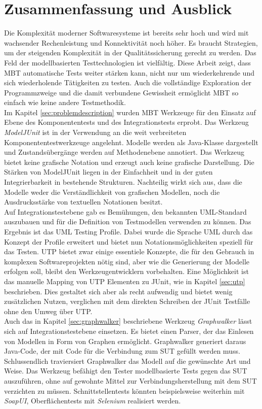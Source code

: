 \section{Zusammenfassung und Ausblick}
\label{sec:conclusion}
Die Komplexität moderner Softwaresysteme ist bereits sehr hoch und wird mit wachsender Rechenleistung und Konnektivität noch höher. Es braucht Strategien, um der steigenden Komplexität in der Qualitätssicherung gerecht zu werden. Das Feld der modellbasierten Testtechnologien ist vielfältig. Diese Arbeit zeigt, dass \Gls{MBT} automatische Tests weiter stärken kann, nicht nur um wiederkehrende und sich wiederholende Tätigkeiten zu testen. Auch die vollständige Exploration der Programmzweige und die damit verbundene Gewissheit ermöglicht \Gls{MBT} so einfach wie keine andere Testmethodik.\\
Im Kapitel \ref{sec:problemdescription}  wurden \Gls{MBT} Werkzeuge für den Einsatz auf Ebene des Komponententests und des Integrationstests erprobt. Das Werkzeug \textit{ModelJUnit} ist in der Verwendung an die weit verbreiteten Komponententestwerkzeuge angelehnt. Modelle werden als Java-Klasse dargestellt und Zustandsübergänge werden auf Methodenebene annotiert. Das Werkzeug bietet keine grafische Notation und erzeugt auch keine grafische Darstellung. Die Stärken von ModelJUnit liegen in der Einfachheit und in der guten Integrierbarkeit in bestehende Strukturen. Nachteilig wirkt sich aus, dass die Modelle weder die Verständlichkeit von grafischen Modellen, noch die Ausdrucksstärke von textuellen Notationen besitzt.\\
Auf Integrationstestebene gab es Bemühungen, den bekannten UML-Standard auszubauen und für die Definition von Testmodellen verwenden zu können. Das Ergebnis ist das UML Testing Profile. Dabei wurde die Sprache UML durch das Konzept der Profile erweitert und bietet nun Notationsmöglichkeiten speziell für das Testen. UTP bietet zwar einige essentiele Konzepte, die für den Gebrauch in komplexen Softwareprojekten nötig sind, aber wie die Generierung der Modelle erfolgen soll, bleibt den Werkzeugentwicklern vorbehalten. Eine Möglichkeit ist das manuelle Mapping von UTP Elementen zu JUnit, wie in Kapitel \ref{sec:utp} beschrieben. Dies gestaltet sich aber als recht aufwendig und bietet wenig zusätzlichen Nutzen, verglichen mit dem direkten Schreiben der JUnit Testfälle ohne den Umweg über UTP.\\
Auch das in Kapitel \ref{sec:graphwalker} beschriebene Werkzeug \textit{Graphwalker} lässt sich auf Integrationstestebene einsetzen. Es bietet einen Parser, der das Einlesen von Modellen in Form von Graphen ermöglicht. Graphwalker generiert daraus Java-Code, der mit Code für die Verbindung zum \Gls{SUT} gefüllt werden muss. Schlussendlich traviersiert Graphwalker das Modell auf die gewünschte Art und Weise. Das Werkzeug befähigt den Tester modellbasierte Tests gegen das \Gls{SUT} auszuführen, ohne auf gewohnte Mittel zur Verbindungsherstellung mit dem \Gls{SUT} verzichten zu müssen. Schnittstellentests könnten beispielsweise weiterhin mit \textit{SoapUI}, Oberflächentests mit \textit{Selenium} realisiert werden.\\
